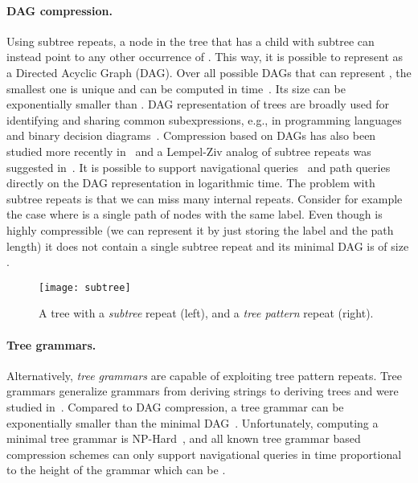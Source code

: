 \documentclass [11pt]{article}
\begin{document}
\paragraph{DAG compression.} Using subtree repeats, a node in the tree  that has a child with subtree  can instead point to any other occurrence of . This way, it is possible to represent  as a Directed Acyclic Graph (DAG). Over all possible DAGs that can represent , the smallest one is unique and can be computed in  time~\cite{DST1980}. Its size can be exponentially smaller than . DAG representation of trees are broadly used for identifying and sharing common subexpressions, e.g., in programming languages~\cite{steven1997advanced}  and binary decision diagrams~\cite{meinel1998algorithms}. Compression based on DAGs has also been studied more recently in~\cite{BKG03,FKG03, lohrey2013xml} and a Lempel-Ziv analog of subtree repeats was suggested in~\cite{LZGonzalo}. It is possible to support navigational queries~\cite{SODA2011} and path queries~\cite{BKG03} directly on the DAG representation in logarithmic time. 
The problem with subtree repeats is that we can miss many internal repeats. Consider for example the case where  is a single path of  nodes with the same label. Even though  is highly compressible (we can represent it by just  storing the label and the path length) it does not contain a single subtree repeat and its minimal DAG is of size . 
\begin{figure}[t]
   \centering
   \texttt{[image: subtree]}
   \caption{A tree  with a {\em subtree} repeat  (left), and a  {\em tree pattern} repeat  (right).}
   \label{fig:subtree}
\end{figure}
\paragraph{Tree grammars.} Alternatively, \emph{tree grammars} are capable of exploiting tree pattern repeats.  Tree grammars generalize grammars from deriving strings to deriving trees and were studied in~\cite{Busatto04grammarBasedtree, BLM08, LohreyEtAl, LM06, MB04}. Compared to DAG compression, a tree grammar can be  exponentially smaller than the minimal DAG~\cite{LM06}. Unfortunately, computing a minimal tree grammar is NP-Hard~\cite{CLL+05}, and all known tree grammar based compression schemes can only support navigational queries in time proportional to the height of the grammar which can be .
\end{document}
